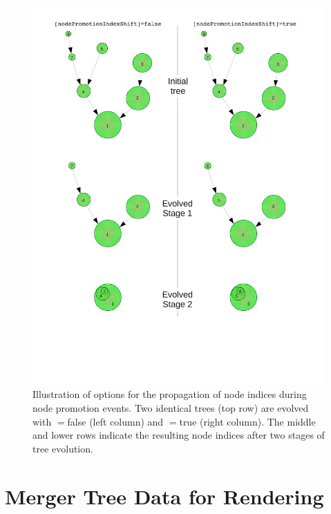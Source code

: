 \begin{figure}
 \begin{center}
 \includegraphics[width=140mm]{Diagrams/NodePromotionIndices.pdf}
 \end{center}
 \caption{Illustration of options for the propagation of node indices during node promotion events. Two identical trees (top row) are evolved with {\normalfont \ttfamily [nodePromotionIndexShift]}$=${\normalfont \ttfamily false} (left column) and {\normalfont \ttfamily [nodePromotionIndexShift]}$=${\normalfont \ttfamily true} (right column). The middle and lower rows indicate the resulting node indices after two stages of tree evolution.}
 \label{fig:NodePromotionIndexAlgorithms}
\end{figure}

\section{Merger Tree Data for Rendering}

